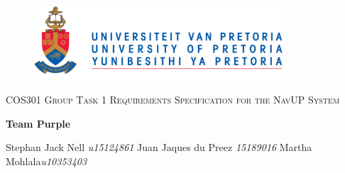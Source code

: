 \begin{titlepage}
	\begin{center}
		\begin{figure}[t]
			\centering
			\includegraphics[width=350px]{UP_Logo.png}
		\end{figure}
		
		\textsc{\LARGE COS301 Group Task 1 \newline\newline Requirements Specification for the NavUP System}
		
		\textbf{\newline Team Purple} \\
		\begin{flushright} \large
			Stephan Jack Nell \emph{u15124861} \newline
			Juan Jaques du Preez \emph{15189016} \newline
			Martha Mohlala\emph{u10353403}\newline
		\end{flushright}
		
		\vfill		
	\end{center}
\end{titlepage}
